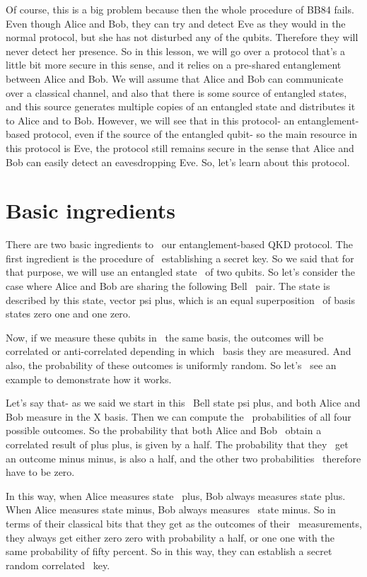 Of course, this is a big problem because then the whole procedure of BB84 fails. Even though Alice and Bob, they can try and detect Eve as they would in the normal protocol, but she has not disturbed any of the qubits. Therefore they will never detect her presence. So in this lesson, we will go over a protocol that's a little bit more secure in this sense, and it relies on a pre-shared entanglement between Alice and Bob. We will assume that Alice and Bob can communicate over a classical channel, and also that there is some source of entangled states, and this source generates multiple copies of an entangled state and distributes it to Alice and to Bob. However, we will see that in this protocol- an entanglement-based protocol, even if the source of the entangled qubit- so the main resource in this protocol is Eve, the protocol still remains secure in the sense that Alice and Bob can easily detect an eavesdropping Eve. So, let's learn about this protocol.

\section{Basic ingredients}

There are two basic ingredients to 
our entanglement-based QKD protocol.
The first ingredient is the procedure of 
establishing a secret key. So we said that
for that purpose, we will use an entangled state 
of two qubits. So let's consider the case where
Alice and Bob are sharing the following Bell 
pair. The state is described by this state,
vector psi plus, which is an equal superposition 
of basis states zero one and one zero.

Now, if we measure these qubits in 
the same basis, the outcomes will be
correlated or anti-correlated depending in which 
basis they are measured. And also, the probability
of these outcomes is uniformly random. So let's 
see an example to demonstrate how it works.

Let's say that- as we said we start in this 
Bell state psi plus, and both Alice and Bob
measure in the X basis. Then we can compute the 
probabilities of all four possible outcomes.
So the probability that both Alice and Bob 
obtain a correlated result of plus plus,
is given by a half. The probability that they 
get an outcome minus minus, is also a half,
and the other two probabilities 
therefore have to be zero.

In this way, when Alice measures state 
plus, Bob always measures state plus. When
Alice measures state minus, Bob always measures 
state minus. So in terms of their classical bits
that they get as the outcomes of their 
measurements, they always get either zero
zero with probability a half, or one one with the 
same probability of fifty percent. So in this way,
they can establish a secret random correlated 
key.

